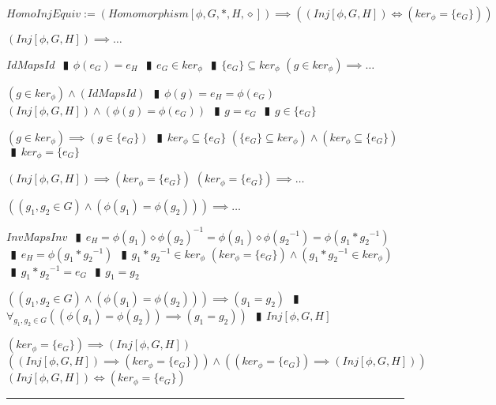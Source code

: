 \documentclass{book}
\newcommand{\abr}{:=}
\newcommand{\pipe}{$\phantom{(}\vrectangleblack\phantom{)}$}
\newcommand{\pr}[1]{\left(#1\right)}
\begin{document}
$HomoInjEquiv \abr (Homomorphism[\phi, G, *, H, \diamond]) \implies \pr{(Inj[\phi, G, H]) \iff (ker_\phi = \{e_G\})}$
\begin{enumerate}
  \lit $(Inj[\phi, G, H]) \implies \ldots$
  \begin{enumerate}
    \lit $IdMapsId$ \pipe $\phi(e_G) = e_H$ \pipe $e_G \in ker_\phi$ \pipe $\{e_G\} \subseteq ker_\phi$
    \lit $(g \in ker_\phi) \implies \ldots$
    \begin{enumerate}
      \lit $(g \in ker_\phi) \land (IdMapsId)$ \pipe $\phi(g) = e_H = \phi(e_G)$
      \lit $(Inj[\phi, G, H]) \land \pr{\phi(g) = \phi(e_G)}$ \pipe $g = e_G$ \pipe $g \in \{e_G\}$
    \end{enumerate}
    \lit $(g \in ker_\phi) \implies (g \in \{e_G\})$ \pipe $ker_\phi \subseteq \{e_G\}$
    \lit $(\{e_G\} \subseteq ker_\phi) \land (ker_\phi \subseteq \{e_G\})$ \pipe $ker_\phi = \{e_G\}$
  \end{enumerate}
  \lit $(Inj[\phi, G, H]) \implies (ker_\phi = \{e_G\})$
  \lit $(ker_\phi = \{e_G\}) \implies \ldots$
  \begin{enumerate}
    \lit $\pr{(g_1, g_2 \in G) \land \pr{\phi(g_1) = \phi(g_2)}} \implies \ldots$
    \begin{enumerate}
      \lit $InvMapsInv$ \pipe $e_H = \phi(g_1) \diamond \phi(g_2)^{-1} = \phi(g_1) \diamond \phi({g_2}^{-1}) = \phi(g_1 * {g_2}^{-1})$ \pipe $e_H = \phi(g_1 * {g_2}^{-1})$ \pipe $g_1 * {g_2}^{-1} \in ker_\phi$
      \lit $(ker_\phi = \{e_G\}) \land (g_1 * {g_2}^{-1} \in ker_\phi)$ \pipe $g_1 * {g_2}^{-1} = e_G$ \pipe $g_1 = g_2$
    \end{enumerate}
    \lit $\pr{(g_1, g_2 \in G) \land \pr{\phi(g_1) = \phi(g_2)}} \implies (g_1 = g_2)$ \pipe $\forall_{g_1, g_2 \in G}\pr{\pr{\phi(g_1) = \phi(g_2)} \implies (g_1 = g_2)}$ \pipe $Inj[\phi, G, H]$
  \end{enumerate}
  \lit $(ker_\phi = \{e_G\}) \implies (Inj[\phi, G, H])$
  \lit $\pr{(Inj[\phi, G, H]) \implies (ker_\phi = \{e_G\})} \land \pr{(ker_\phi = \{e_G\}) \implies (Inj[\phi, G, H])}$
  \lit $(Inj[\phi, G, H]) \iff (ker_\phi = \{e_G\})$
\end{enumerate} \vspace{.75mm} \hrule \vspace{.75mm} \ \\
\end{document}
